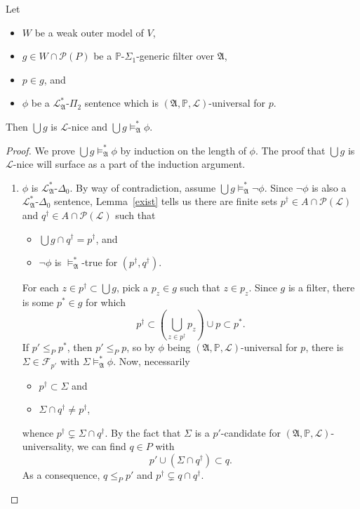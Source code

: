 \documentclass[12pt]{article}
\numberwithin{equation}{section}
\begin{document}
\begin{lem}\label{uni}
Let 
\begin{itemize} 
    \item $W$ be a weak outer model of $V$,
    \item $g \in W \cap \mathcal{P}(P)$ be a $\mathbb{P}$-$\Sigma_1$-generic filter over $\mathfrak{A}$,
    \item $p \in g$, and
    \item $\phi$ be a $\mathcal{L}^{*}_{\mathfrak{A}}$-$\Pi_2$ sentence which is $(\mathfrak{A}, \mathbb{P}, \mathcal{L})$-universal for $p$.
\end{itemize} 
Then $\bigcup g$ is $\mathcal{L}$-nice and $\bigcup g \models^{*}_{\mathfrak{A}} \phi$.
\end{lem}
\begin{proof}
We prove $\bigcup g \models^{*}_{\mathfrak{A}} \phi$ by induction on the length of $\phi$. The proof that $\bigcup g$ is $\mathcal{L}$-nice will surface as a part of the induction argument.
\begin{enumerate}[label=Case \arabic*:, leftmargin=50pt]
    \item $\phi$ is $\mathcal{L}^{*}_{\mathfrak{A}}$-$\Delta_0$. By way of contradiction, assume $\bigcup g \models^{*}_{\mathfrak{A}} \neg \phi$. Since $\neg \phi$ is also a $\mathcal{L}^{*}_{\mathfrak{A}}$-$\Delta_0$ sentence, Lemma~\ref{exist} tells us there are finite sets $p^{\dagger} \in A \cap \mathcal{P}(\mathcal{L})$ and $q^{\dagger} \in A \cap \mathcal{P}(\mathcal{L})$ such that 
    \begin{itemize}
        \item $\bigcup g \cap q^{\dagger} = p^{\dagger}$, and
        \item $\neg \phi$ is $\models^{*}_{\mathfrak{A}}$-true for $(p^{\dagger}, q^{\dagger})$.
    \end{itemize}
    For each $z \in p^{\dagger} \subset \bigcup g$, pick a $p_z \in g$ such that $z \in p_z$. Since $g$ is a filter, there is some $p^* \in g$ for which $$p^{\dagger} \subset (\bigcup_{z \in p^{\dagger}} p_z) \cup p \subset p^*.$$ If $p' \leq_{P} p^*$, then $p' \leq_{P} p$, so by $\phi$ being $(\mathfrak{A}, \mathbb{P}, \mathcal{L})$-universal for $p$, there is $\Sigma \in \mathcal{F}_{p'}$ with $\Sigma \models^*_{\mathfrak{A}} \phi$. Now, necessarily 
    \begin{itemize}
        \item $p^{\dagger} \subset \Sigma$ and
        \item $\Sigma \cap q^{\dagger} \neq p^{\dagger}$,
    \end{itemize}
    whence $p^{\dagger} \subsetneq \Sigma \cap q^{\dagger}$. By the fact that $\Sigma$ is a $p'$-candidate for $(\mathfrak{A}, \mathbb{P}, \mathcal{L})$-universality, we can find $q \in P$ with $$p' \cup (\Sigma \cap q^{\dagger}) \subset q.$$ As a consequence, $q \leq_P p'$ and $p^{\dagger} \subsetneq q \cap q^{\dagger}$.
    

\end{enumerate}
\end{proof}
\end{document}
